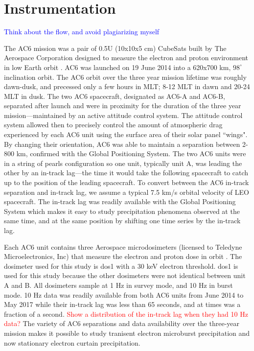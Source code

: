 \documentclass[draft]{agujournal2019}
\begin{document}
\section{Instrumentation} \label{instrumentation}
\textcolor{blue}{Think about the flow, and avoid plagiarizing myself}

The AC6 mission was a pair of 0.5U (10x10x5 cm) CubeSats built by The Aerospace Corporation designed to measure the electron and proton environment in low Earth orbit \cite{O'brien2016}. AC6 was launched on 19 June 2014 into a 620x700 km, $98^\circ$ inclination orbit. The AC6 orbit over the three year mission lifetime was roughly dawn-dusk, and precessed only a few hours in MLT; 8-12 MLT in dawn and 20-24 MLT in dusk. The two AC6 spacecraft, designated as AC6-A and AC6-B, separated after launch and were in proximity for the duration of the three year mission---maintained by an active attitude control system. The attitude control system allowed then to precisely control the amount of atmospheric drag experienced by each AC6 unit using the surface area of their solar panel ``wings". By changing their orientation, AC6 was able to maintain a separation between 2-800 km, confirmed with the Global Positioning System. The two AC6 units were in a string of pearls configuration so one unit, typically unit A, was leading the other by an in-track lag---the time it would take the following spacecraft to catch up to the position of the leading spacecraft. To convert between the AC6 in-track separation and in-track lag, we assume a typical 7.5 km/s orbital velocity of LEO spacecraft. The in-track lag was readily available with the Global Positioning System which makes it easy to study precipitation phenomena observed at the same time, and at the same position by shifting one time series by the in-track lag.

Each AC6 unit contains three Aerospace microdosimeters (licensed to Teledyne Microelectronics, Inc) that measure the electron and proton dose in orbit \cite{O'brien2016}. The dosimeter used for this study is dos1 with a $30$ keV electron threshold. dos1 is used for this study because the other dosimeters were not identical between unit A and B. All dosimeters sample at 1 Hz in survey mode, and 10 Hz in burst mode. 10 Hz data was readily available from both AC6 units from June 2014 to May 2017 while their in-track lag was less than 65 seconds, and at times was a fraction of a second. \textcolor{red}{Show a distribution of the in-track lag when they had 10 Hz data?} The variety of AC6 separations and data availability over the three-year mission makes it possible to study tranisent electron microburst precipitation \cite{Shumko2020} and now stationary electron curtain precipitation.
\end{document}
